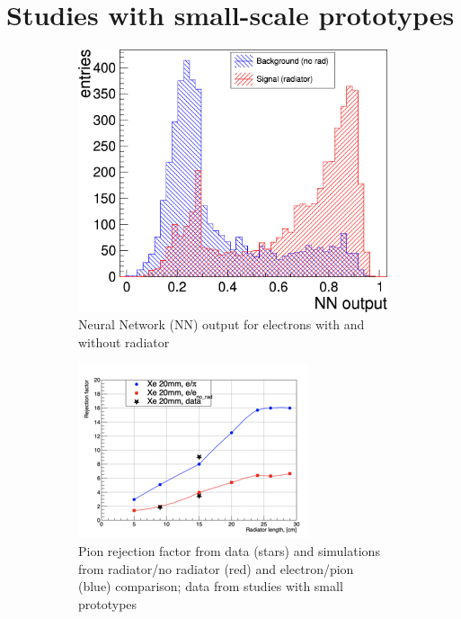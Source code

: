 \documentclass[%
preprint,
nofootinbib,
 amsmath,amssymb,
 aps,
floatfix,
]{revtex4-1}
\begin{document}
\section{Studies with small-scale prototypes}
 
\begin{figure}[h]
  \begin{subfigure}[b]{0.49\textwidth}
    \includegraphics[width=\textwidth]{./fig/GEM_TRD_NNoutput.jpg}
    \caption{Neural Network (NN) output for electrons with and without 
radiator}
    \label{fig:NNout}
  \end{subfigure}
  \begin{subfigure}[b]{0.40\textwidth}
    \includegraphics[width=\textwidth]{./fig/pion_rejection.png}
    \caption{Pion rejection factor from data (stars) 
and simulations from radiator/no radiator (red)
and electron/pion (blue) comparison;
data from studies with small prototypes}
    \label{fig:profile}
  \end{subfigure}
  \caption{
}
  \label{fig:BH_pove_pi}
\end{figure}
\end{document}
